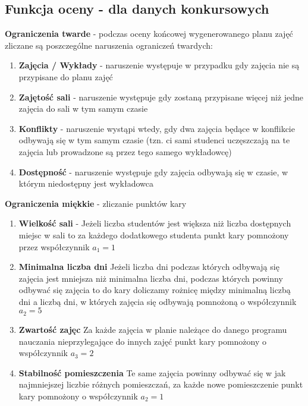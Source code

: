 \subsection{Funkcja oceny - dla danych konkursowych}
\textbf{Ograniczenia twarde} - podczas oceny końcowej wygenerowanego planu zajęć zliczane są poszczególne naruszenia ograniczeń twardych:\\
\begin{enumerate}
\item \textbf{Zajęcia / Wykłady} - naruszenie występuje w przypadku gdy zajęcia nie są przypisane do planu zajęć
\item \textbf{Zajętość sali} - naruszenie występuje gdy zostaną przypisane więcej niż jedne zajęcia do sali w tym samym czasie
\item \textbf{Konflikty} - naruszenie wystąpi wtedy, gdy dwa zajęcia będące w konflikcie odbywają się w tym samym czasie (tzn. ci sami studenci uczęszczają na te zajęcia lub prowadzone są przez tego samego wykładowcę)
\item \textbf{Dostępność} - naruszenie występuje gdy zajęcia odbywają się w czasie, w którym niedostępny jest wykładowca 
\end{enumerate} 

\textbf{Ograniczenia miękkie} - zliczanie punktów kary
\begin{enumerate}
\item \textbf{Wielkość sali} - Jeżeli liczba studentów jest większa niż liczba dostępnych miejsc w sali to za każdego dodatkowego studenta punkt kary pomnożony przez współczynnik ${a_{1} = 1}$ 
\item \textbf{Minimalna liczba dni}
Jeżeli liczba dni podczas których odbywają się zajęcia jest mniejsza niż minimalna liczba dni, podczas których powinny odbywać się zajęcia to do kary doliczamy rożnicę między minimalną liczbą dni a liczbą dni, w których zajęcia się odbywają pomnożoną o współczynnik $a_{2} = 5$ 
\item \textbf{Zwartość zajęc}
Za każde zajęcia w planie należące do danego programu nauczania nieprzylegające do innych zajęć punkt kary pomnożony o współczynnik ${a_{3} = 2}$
\item \textbf{Stabilność pomieszczenia}
Te same zajęcia powinny odbywać się w jak najmniejszej liczbie różnych pomieszczań, za każde nowe pomieszczenie punkt kary pomnożony o współczynnik ${a_{2} = 1}$
\end{enumerate}

